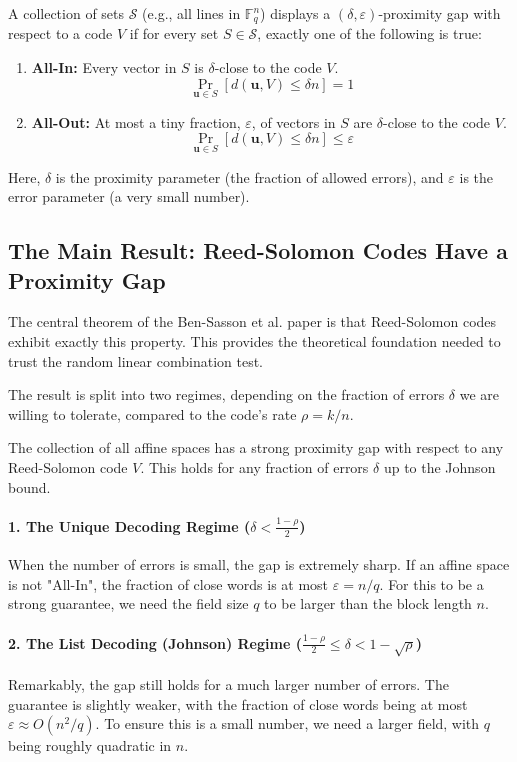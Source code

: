 \documentclass{article}
\begin{document}
\begin{tcolorbox}[breakable, title={Definition: Proximity Gap}]
A collection of sets $\mathcal{S}$ (e.g., all lines in $\mathbb{F}_q^n$) displays a $(\delta, \varepsilon)$-proximity gap with respect to a code $V$ if for every set $S \in \mathcal{S}$, exactly one of the following is true:
\begin{enumerate}
    \item \textbf{All-In:} Every vector in $S$ is $\delta$-close to the code $V$.
    \[ \Pr_{\mathbf{u} \in S} \left[ d(\mathbf{u}, V) \le \delta n \right] = 1 \]
    \item \textbf{All-Out:} At most a tiny fraction, $\varepsilon$, of vectors in $S$ are $\delta$-close to the code $V$.
    \[ \Pr_{\mathbf{u} \in S} \left[ d(\mathbf{u}, V) \le \delta n \right] \le \varepsilon \]
\end{enumerate}
Here, $\delta$ is the proximity parameter (the fraction of allowed errors), and $\varepsilon$ is the error parameter (a very small number).
\end{tcolorbox}


\subsection{The Main Result: Reed-Solomon Codes Have a Proximity Gap}
The central theorem of the Ben-Sasson et al. paper\cite{ben2023proximity} is that Reed-Solomon codes exhibit exactly this property. This provides the theoretical foundation needed to trust the random linear combination test.

The result is split into two regimes, depending on the fraction of errors $\delta$ we are willing to tolerate, compared to the code's rate $\rho = k/n$.

\begin{tcolorbox}[breakable, title={Theorem (Informal): Proximity Gap for RS Codes}]
The collection of all affine spaces has a strong proximity gap with respect to any Reed-Solomon code $V$. This holds for any fraction of errors $\delta$ up to the Johnson bound.

\paragraph{1. The Unique Decoding Regime ($\delta < \frac{1-\rho}{2}$)}
When the number of errors is small, the gap is extremely sharp. If an affine space is not "All-In", the fraction of close words is at most $\varepsilon = n/q$. For this to be a strong guarantee, we need the field size $q$ to be larger than the block length $n$.

\paragraph{2. The List Decoding (Johnson) Regime ($\frac{1-\rho}{2} \le \delta < 1 - \sqrt{\rho}$)}
Remarkably, the gap still holds for a much larger number of errors. The guarantee is slightly weaker, with the fraction of close words being at most $\varepsilon \approx O(n^2/q)$. To ensure this is a small number, we need a larger field, with $q$ being roughly quadratic in $n$.
\end{tcolorbox}
\end{document}
